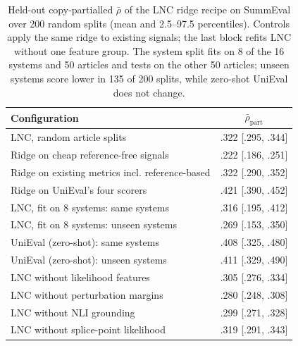\begin{table}[t]
\centering
\caption{Held-out copy-partialled $\bar{\rho}$ of the LNC ridge recipe on SummEval over 200 random splits (mean and 2.5--97.5 percentiles). Controls apply the same ridge to existing signals; the last block refits LNC without one feature group. The system split fits on 8 of the 16 systems and 50 articles and tests on the other 50 articles; unseen systems score lower in 135 of 200 splits, while zero-shot UniEval does not change.}
\label{tab:lnc_robust}
\small
\begin{tabular}{@{}lc@{}}
\toprule
Configuration & $\bar{\rho}_{\mathrm{part}}$ \\
\midrule
LNC, random article splits & .322 {\scriptsize [.295, .344]} \\
Ridge on cheap reference-free signals & .222 {\scriptsize [.186, .251]} \\
Ridge on existing metrics incl. reference-based & .322 {\scriptsize [.290, .352]} \\
Ridge on UniEval's four scorers & .421 {\scriptsize [.390, .452]} \\
\midrule
LNC, fit on 8 systems: same systems & .316 {\scriptsize [.195, .412]} \\
LNC, fit on 8 systems: unseen systems & .269 {\scriptsize [.153, .350]} \\
UniEval (zero-shot): same systems & .408 {\scriptsize [.325, .480]} \\
UniEval (zero-shot): unseen systems & .411 {\scriptsize [.329, .490]} \\
\midrule
LNC without likelihood features & .305 {\scriptsize [.276, .334]} \\
LNC without perturbation margins & .280 {\scriptsize [.248, .308]} \\
LNC without NLI grounding & .299 {\scriptsize [.271, .328]} \\
LNC without splice-point likelihood & .319 {\scriptsize [.291, .343]} \\
\bottomrule
\end{tabular}
\end{table}
